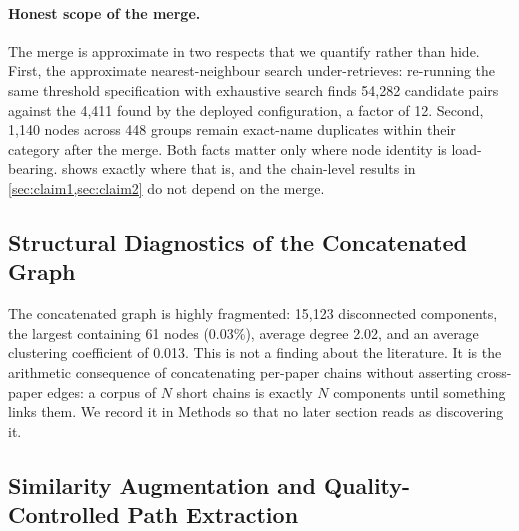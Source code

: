 \documentclass[10pt,twocolumn,letterpaper]{article}
\begin{document}
\paragraph{Honest scope of the merge.} The merge is approximate in two respects
that we quantify rather than hide. First, the approximate nearest-neighbour
search under-retrieves: re-running the same threshold specification with
exhaustive search finds 54{,}282 candidate pairs against the 4{,}411 found by the
deployed configuration, a factor of 12.
Second, 1{,}140 nodes across 448 groups remain exact-name duplicates within their
category after the merge.
Both facts matter only where node identity is load-bearing. 
shows exactly where that is, and the chain-level results in \cref{sec:claim1,sec:claim2}
do not depend on the merge.

\subsection{Structural Diagnostics of the Concatenated Graph}

The concatenated graph is highly fragmented: 15{,}123 disconnected components,
the largest containing 61 nodes (0.03\%), average degree 2.02, and an average
clustering coefficient of 0.013.
This is not a finding about the literature. It is the arithmetic consequence of
concatenating per-paper chains without asserting cross-paper edges: a corpus of
$N$ short chains is exactly $N$ components until something links them. We record
it in Methods so that no later section reads as discovering it.

\subsection{Similarity Augmentation and Quality-Controlled Path Extraction}
\label{sec:paths}
\end{document}
